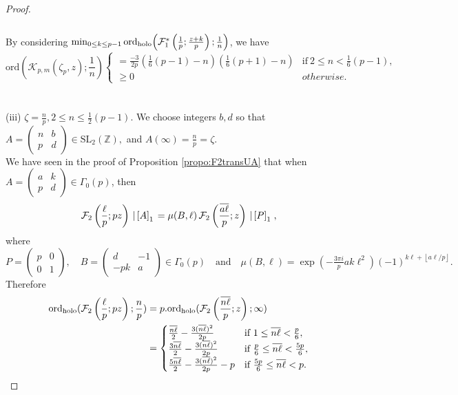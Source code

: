 \documentclass[12pt]{amsart}
\theoremstyle{definition}
\theoremstyle{remark}
\numberwithin{equation}{section}
\newcommand{\SL}{\mbox{SL}}
\newcommand\Fell[4]{\mathcal{F}_{#1}\left(\frac{#2}{#3};#4\right)}
\newcommand\SFell[4]{\mathcal{F}_{#1}^{*}\left(\frac{#2}{#3};#4\right)}
\newcommand\FL[1]{\left\lfloor#1\right\rfloor}
\newcommand\stroke[3]{#1\,\left\arrowvert\,\left[#2\right]_{#3}\right.}
\newcommand\ord{\mbox{ord}}
\newcommand\hord{\mbox{ord}_{\mbox{\scriptsize holo}}}
\newcommand\propo[1]{\ref{propo:#1}}
\begin{document}
\begin{proof}
\begin{align*}
\end{align*}
\\
By considering $\min_{0\leq k \leq p-1} \hord\Big(\SFell{1}{1}{p}{\frac{z+k}{p}};\frac{1}{n}\Big)$, we have $$\ord(\mathcal{K}_{p,m}(\zeta_p,z);\frac{1}{n}) \begin{cases}
      =\frac{-3}{2p}(\frac{1}{6} (p-1)-n)(\frac{1}{6} (p+1)-n) & \text{if}\ 2\leq n< \frac{1}{6}(p-1), \\
      \geq 0 & otherwise.      
    \end{cases}$$ 
\\\\
(iii) $\zeta=\frac{n}{p},  2 \leq n \leq \frac{1}{2}(p-1)$. We choose integers $b,d$ so that $A = \begin{pmatrix} n & b \\ p & d\end{pmatrix} \in \SL_2(\mathbb{Z}),$  and $A(\infty)=\frac{n}{p}=\zeta$.
\\
We have seen in the proof of Proposition \propo{F2transUA} that when 
$A = \begin{pmatrix} a & k \\ p & d\end{pmatrix} \in \Gamma_0(p)$, then 
$$
\Fell{2}{\ell}{p}{p z} \stroke{}{A}{1}
=\mu(B,\ell)\, \Fell{2}{\overline{a\ell}}{p}{z}\stroke{}{P}{1},
$$
where
$$
P = \begin{pmatrix} p & 0 \\ 0 & 1\end{pmatrix},\quad
B = \begin{pmatrix} d & -1 \\ -pk & a\end{pmatrix}
\in \Gamma_0(p) \quad\mbox{and}\quad 
\mu(B,\ell) = \exp( -\tfrac{3 \pi i}{p} a k \ell^2) 
(-1)^{k\ell + \FL{a\ell/p}}.
$$
Therefore
\begin{align*}
 \hord(\Fell{2}{\ell}{p}{p z};\frac{n}{p})&=p.\hord(\Fell{2}{\overline{n\ell}}{p}{z};\infty)
\\
&=\begin{cases}
      \frac{{\overline{n\ell}}}{2}-\frac{3({\overline{n\ell}})^2}{2p} & \text{if}\ 1 \leq {\overline{n\ell}} < \frac{p}{6}, \\
      \frac{3{\overline{n\ell}}}{2}-\frac{3({\overline{n\ell}})^2}{2p} & \text{if}\ \frac{p}{6} \leq {\overline{n\ell}} < \frac{5p}{6}, \\
      \frac{5{\overline{n\ell}}}{2}-\frac{3({\overline{n\ell}})^2}{2p}-p & \text{if}\ \frac{5p}{6} \leq {\overline{n\ell}} < p.
    \end{cases}   

\end{align*}
\end{proof}
\end{document}
